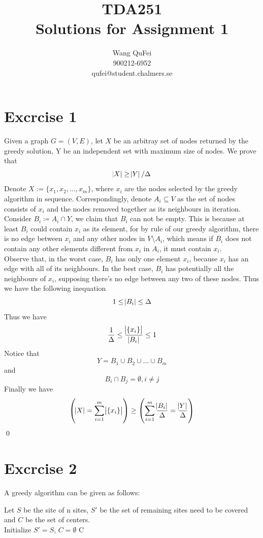 \documentclass[10pt]{article}
\title{TDA251\\Solutions for Assignment 1}
\author{Wang QuFei\\900212-6952\\qufei@student.chalmers.se}
\begin{document}
\maketitle
\section*{Excrcise 1}
Given a graph $G = (V,E)$, let $X$ be an arbitray set of nodes returned by the greedy solution, Y be an independent set with maximum size of nodes. We prove that
										 \[\abs{X} \geq \abs{Y}/\Delta\]
Denote $X := \{x_{1}, x_{2},\ldots, x_{m}\}$, where $x_{i}$ are the nodes selected by the greedy algorithm in sequence. Correspondingly, denote $A_{i} \subseteq V$ as the set of nodes consists of $x_{i}$ and the nodes removed together as its neighbours in iteration.\\
Consider $B_{i} \coloneqq A_{i} \cap Y$, we claim that $B_{i}$ can not be empty. This is because at least $B_{i}$ could contain $x_{i}$ as its element, for by rule of our greedy algorithm, there is no edge between $x_{i}$ and any other nodes in $V \setminus A_{i}$, which means if $B_{i}$ does not contain any other elements different from $x_{i}$ in $A_{i}$, it must contain $x_{i}$.\\
Observe that, in the worst case, $B_{i}$ has only one element $x_{i}$, because $x_{i}$ has an edge with all of its neighbours. In the best case, $B_{i}$ has potentially all the neighbours of $x_{i}$, supposing there's no edge between any two of these nodes. Thus we have the following inequation
								\[1 \leq \abs{B_i} \leq \Delta\]
Thus we have
								\[\frac{1}{\Delta} \leq \frac{\abs{\{x_i\}}}{\abs{B_{i}}} \leq 1\]
Notice that 
								\[Y = B_{1} \cup B_{2} \cup \ldots \cup B_{m}\]
and
								\[B_{i} \cap B_{j} = \emptyset, i \neq j \]
Finally we have 
								\[\left( \abs{X} = \sum_{i=1}^{m}\abs{\{x_{i}\}} \right) \geq \left( \sum_{i=1}^{m}\frac{\abs{B_{i}}}{\Delta} = \frac{\abs{Y}}{\Delta} \right)\]
\qed
\section*{Excrcise 2}
A greedy algorithm can be given as follows:
\begin{algorithm}
\begin{algorithmic}
\STATE Let $S$ be the site of n sites, $S'$ be the set of remaining sites need to be covered and $C$ be the set of centers.\\
\STATE Initialize $S' = S$, $C = \emptyset$
\ENDWHILE
\RETURN C
\end{algorithmic}
\end{algorithm}
\end{document}
